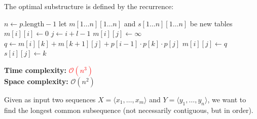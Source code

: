 \documentclass[a4paper,landscape]{article}
\newcommand{\timecomplexity}[1]{\textcolor{red}{#1}}
\newcommand{\bigo}{\mathcal{O}}
\begin{document}
\begin{multicols}{7}
The optimal substructure is defined by the recurrence:


\begin{algorithmic}[1]
        \State $n \gets p.\text{length} - 1$
        \State let $m[1 \dots n][1 \dots n]$ and $s[1 \dots n][1 \dots n]$ be new tables
            \State $m[i][i] \gets 0$
        \EndFor
         
                \State $j \gets i + l - 1$
                \State $m[i][j] \gets \infty$
                    \State $q \gets m[i][k] + m[k + 1][j] + p[i - 1] \cdot p[k] \cdot p[j]$
                        \State $m[i][j] \gets q$
                        \State $s[i][j] \gets k$ 
                    \EndIf
                \EndFor
            \EndFor
        \EndFor
    \EndProcedure
\end{algorithmic}

\textbf{Time complexity:} \timecomplexity{\(\bigo(n^3)\)} \quad \\
\textbf{Space complexity:} $\bigo(n^2)$
\endtcolorbox

\tcolorbox[mybox={Longest Common Subsequence}]
Given as input two sequences $X = \langle x_1, \dots, x_m \rangle$ and $Y = \langle y_1, \dots, y_n \rangle$, we want to find the longest common subsequence (not necessarily contiguous, but in order).


\end{multicols}
\end{document}

